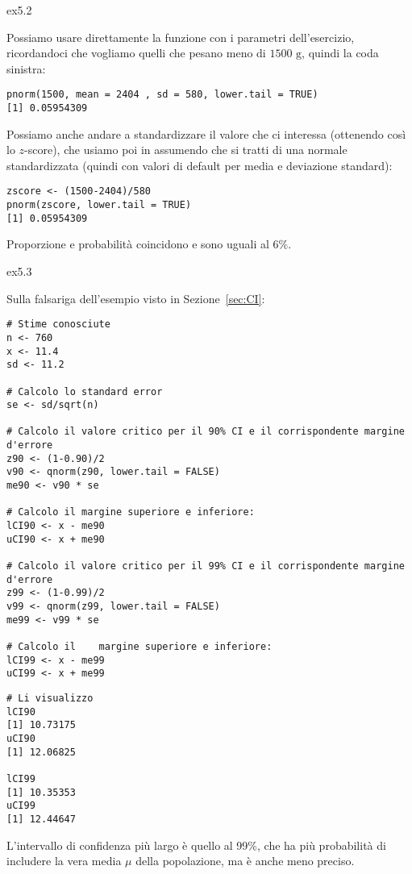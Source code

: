\vspace{0.5cm}	

\begin{solution}{ex5.2}

\noindent Possiamo usare direttamente la funzione  con i parametri dell'esercizio, ricordandoci che vogliamo quelli che pesano meno di $1500 \text{ g}$, quindi la coda sinistra:

\begin{lstlisting}[style=Rstyle]
pnorm(1500, mean = 2404 , sd = 580, lower.tail = TRUE)
[1] 0.05954309
\end{lstlisting}

\noindent Possiamo anche andare a standardizzare il valore che ci interessa (ottenendo cos\`i lo $z$-score), che usiamo poi in  assumendo che si tratti di una normale standardizzata (quindi con valori di default per media e deviazione standard):

\begin{lstlisting}[style=Rstyle]
zscore <- (1500-2404)/580
pnorm(zscore, lower.tail = TRUE)
[1] 0.05954309
\end{lstlisting}

\noindent Proporzione e probabilit\`a coincidono e sono uguali al $6\%$.

\end{solution}

\vspace{0.5cm}

\begin{solution}{ex5.3}

\noindent Sulla falsariga dell'esempio visto in Sezione~\ref{sec:CI}:

\begin{lstlisting}[style=Rstylescript]
# Stime conosciute
n <- 760
x <- 11.4
sd <- 11.2

# Calcolo lo standard error
se <- sd/sqrt(n)

# Calcolo il valore critico per il 90% CI e il corrispondente margine d'errore
z90 <- (1-0.90)/2
v90 <- qnorm(z90, lower.tail = FALSE)
me90 <- v90 * se

# Calcolo il margine superiore e inferiore:
lCI90 <- x - me90
uCI90 <- x + me90

# Calcolo il valore critico per il 99% CI e il corrispondente margine d'errore
z99 <- (1-0.99)/2
v99 <- qnorm(z99, lower.tail = FALSE)
me99 <- v99 * se

# Calcolo il	margine superiore e inferiore:
lCI99 <- x - me99
uCI99 <- x + me99
\end{lstlisting}


\begin{lstlisting}[style=Rstyle]
# Li visualizzo
lCI90
[1] 10.73175
uCI90
[1] 12.06825
 
lCI99
[1] 10.35353
uCI99
[1] 12.44647
\end{lstlisting}

\noindent L'intervallo di confidenza pi\`u largo \`e quello al 99\%, che ha pi\`u probabilit\`a di includere la vera media $\mu$ della popolazione, ma \`e anche meno preciso.

\end{solution}

